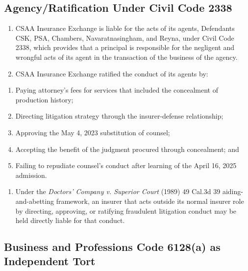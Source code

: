 \subsection{Agency/Ratification Under Civil Code \textsection{} 2338}\label{agencyratification-under-civil-code-2338}

\begin{enumerate}
\def\labelenumi{\arabic{enumi}.}
\setcounter{enumi}{15}
\item
  CSAA Insurance Exchange is liable for the acts of its agents, Defendants CSK, PSA, Chambers, Navaratnasingham, and Reyna, under Civil Code \textsection{} 2338, which provides that a principal is responsible for the negligent and wrongful acts of its agent in the transaction of the business of the agency.
\item
  CSAA Insurance Exchange ratified the conduct of its agents by:
\end{enumerate}

\begin{enumerate}
\def\labelenumi{(\alph{enumi})}
\item
  Paying attorney's fees for services that included the concealment of production history;
\item
  Directing litigation strategy through the insurer-defense relationship;
\item
  Approving the May 4, 2023 substitution of counsel;
\item
  Accepting the benefit of the judgment procured through concealment; and
\item
  Failing to repudiate counsel's conduct after learning of the April 16, 2025 admission.
\end{enumerate}

\begin{enumerate}
\def\labelenumi{\arabic{enumi}.}
\setcounter{enumi}{17}
\tightlist
\item
  Under the \emph{Doctors' Company v. Superior Court} (1989) 49 Cal.3d 39 aiding-and-abetting framework, an insurer that acts outside its normal insurer role by directing, approving, or ratifying fraudulent litigation conduct may be held directly liable for that conduct.
\end{enumerate}

\subsection{Business and Professions Code \textsection{} 6128(a) as Independent Tort}\label{business-and-professions-code-6128a-as-independent-tort}

